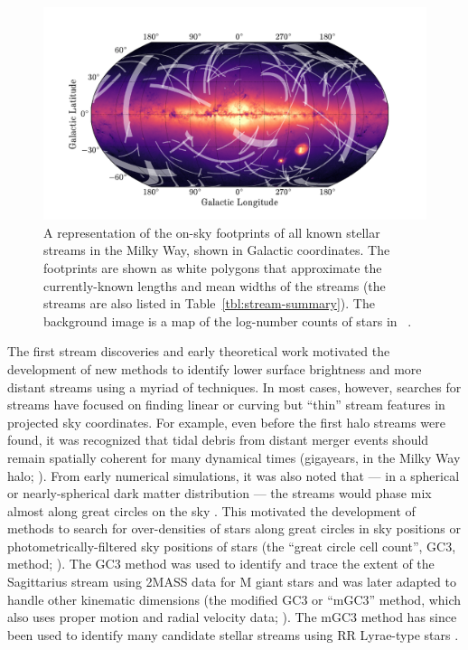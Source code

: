 \documentclass[final,5p,times,twocolumn,authoryear]{elsarticle}
\begin{document}
\begin{figure}[t!]
\begin{center}
\includegraphics[width=1\textwidth]{stream-sky-map.pdf}
\end{center}
\caption{%
A representation of the on-sky footprints of all known stellar streams in the Milky Way,
shown in Galactic coordinates.
The footprints are shown as white polygons that approximate the currently-known lengths
and mean widths of the streams (the streams are also listed in
Table~\ref{tbl:stream-summary}).
The background image is a map of the log-number counts of stars in \gaia\ .
\label{fig:sky-map}
}
\end{figure}

The first stream discoveries and early theoretical work motivated the development of
new methods to identify lower surface brightness and more distant streams using a myriad
of techniques.
In most cases, however, searches for streams have focused on finding linear or curving
but ``thin'' stream features in projected sky coordinates.
For example, even before the first halo streams were found, it was recognized that tidal
debris from distant merger events should remain spatially coherent for many dynamical
times (gigayears, in the Milky Way halo; \citealt{johnston:1998, helmi:1999}).
From early numerical simulations, it was also noted that --- in a spherical or
nearly-spherical dark matter distribution --- the streams would phase mix almost along
great circles on the sky \citep{johnston:1996, Ibata:XXXX, others}.
This motivated the development of methods to search for over-densities of stars along
great circles in sky positions or photometrically-filtered sky positions of stars (the
``great circle cell count'', GC3, method; \citealt{johnston:1996}).
The GC3 method was used to identify and trace the extent of the Sagittarius stream using
2MASS data for M giant stars \citep{majewski:2003} and was later adapted to handle other
kinematic dimensions (the modified GC3 or ``mGC3'' method, which also uses proper motion
and radial velocity data; \citealt{Mateu:2011}).
The mGC3 method has since been used to identify many candidate stellar streams using RR
Lyrae-type stars \citep{mateu:2018}.
\end{document}
